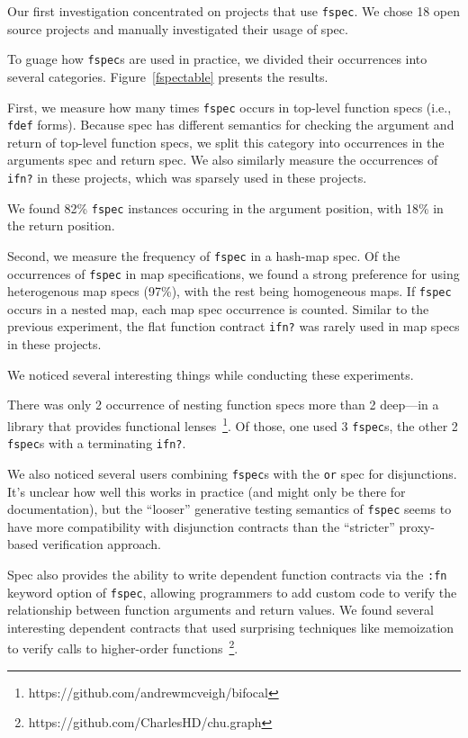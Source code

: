 Our first investigation concentrated on projects that use \texttt{fspec}.
We chose 18 open source projects and manually investigated their usage of spec.

To guage how \texttt{fspec}s are used in practice, we divided their occurrences
into several categories. 
Figure~\ref{fspectable} presents the results.

First, we measure how many times \texttt{fspec} occurs in top-level function
specs (i.e., \texttt{fdef} forms). Because spec has different semantics for
checking the argument and return of top-level function specs, we split this
category into occurrences in the arguments spec and return spec.
We also similarly measure the occurrences of \texttt{ifn?} in these projects,
which was sparsely used in these projects.

We found 82\% \texttt{fspec} instances occuring in the argument position,
with 18\% in the return position.

Second, we measure the frequency of \texttt{fspec} in a hash-map spec.
Of the occurrences of \texttt{fspec} in map specifications, 
we found a strong preference for using heterogenous map specs (97\%),
with the rest being homogeneous maps.
If \texttt{fspec} occurs in a nested map, each map spec occurrence is counted.
Similar to the previous experiment, the flat function contract \texttt{ifn?} was rarely used 
in map specs in these projects.

We noticed several interesting things while conducting these experiments.

There was only 2 occurrence of nesting function specs more than 2 deep---in a library
that provides functional lenses~\footnote{https://github.com/andrewmcveigh/bifocal}.
Of those, one used 3 \texttt{fspec}s, the other 2 \texttt{fspec}s with a terminating \texttt{ifn?}.

We also noticed several users combining \texttt{fspec}s with the \texttt{or} spec
for disjunctions. It's unclear how well this works in practice (and might only be
there for documentation), but the ``looser'' generative testing semantics of \texttt{fspec}
seems to have more compatibility with disjunction contracts than the ``stricter''
proxy-based verification approach.

Spec also provides the ability to write dependent function contracts via the \texttt{:fn}
keyword option of \texttt{fspec}, allowing programmers
to add custom code to verify the relationship between function arguments and return values.
We found several interesting dependent contracts that used surprising techniques like
memoization to verify calls to higher-order functions~\footnote{https://github.com/CharlesHD/chu.graph}.

